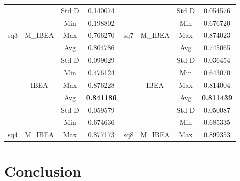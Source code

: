 \begin{table}[]
\begin{tabular}{cccccccc}
		&                           & Std D      & 0.140074          &                       &                                                   & Std D      & 0.054576          \\ \cline{3-4} \cline{7-8} 
		&                           & Min        & 0.198802          &                       &                                                   & Min        & 0.676720          \\ \cline{3-4} \cline{7-8} 
		\multirow{-8}{*}{sq3} & \multirow{-4}{*}{M\_IBEA} & Max        & 0.766270          & \multirow{-8}{*}{sq7} & \multirow{-4}{*}{M\_IBEA}                         & Max        & 0.874023          \\ \hline
		&                           & Avg        & 0.804786          &                       &                                                   & Avg        & 0.745065          \\ \cline{3-4} \cline{7-8} 
		&                           & Std D      & 0.099029          &                       &                                                   & Std D      & 0.036454          \\ \cline{3-4} \cline{7-8} 
		&                           & Min        & 0.476124          &                       &                                                   & Min        & 0.643070          \\ \cline{3-4} \cline{7-8} 
		& \multirow{-4}{*}{IBEA}    & Max        & 0.876228          &                       & \multirow{-4}{*}{IBEA}                            & Max        & 0.814004          \\ \cline{2-4} \cline{6-8} 
		&                           & Avg        & \textbf{0.841186} &                       & \cellcolor[HTML]{C0C0C0}                          & Avg        & \textbf{0.811439} \\ \cline{3-4} \cline{7-8} 
		&                           & Std D      & 0.059579          &                       & \cellcolor[HTML]{C0C0C0}                          & Std D      & 0.050087          \\ \cline{3-4} \cline{7-8} 
		&                           & Min        & 0.674636          &                       & \cellcolor[HTML]{C0C0C0}                          & Min        & 0.685335          \\ \cline{3-4} \cline{7-8} 
		\multirow{-8}{*}{sq4} & \multirow{-4}{*}{M\_IBEA} & Max        & 0.877173          & \multirow{-8}{*}{sq8} & \multirow{-4}{*}{\cellcolor[HTML]{C0C0C0}M\_IBEA} & Max        & 0.899353          \\ \hline
	\end{tabular}
\end{table}

	
\section{Conclusion}